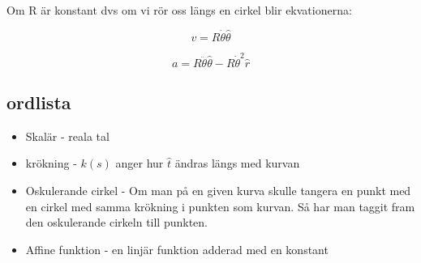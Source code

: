 \documentclass[a4paper,12pt]{article}
\begin{document}
Om R är konstant dvs om vi rör oss längs en cirkel blir ekvationerna:

\begin{equation}
v = R\dot{\theta}\hat{\theta}
\end{equation}

\begin{equation}
a = R\ddot{\theta}\hat{\theta}-R\dot{\theta}^2\hat{r}
\end{equation}


\subsection{ordlista}

\begin{itemize}

  \item  Skalär - reala tal

  \item  krökning - $k(s)$ anger hur $\hat{t}$ ändras längs med kurvan

  \item  Oskulerande cirkel -  Om man på en given kurva skulle tangera 
         en punkt med en cirkel med samma krökning i punkten som kurvan.
         Så har man taggit fram den oskulerande cirkeln till punkten.

  \item Affine funktion - en linjär funktion adderad med en konstant

\end{itemize}
\end{document}
